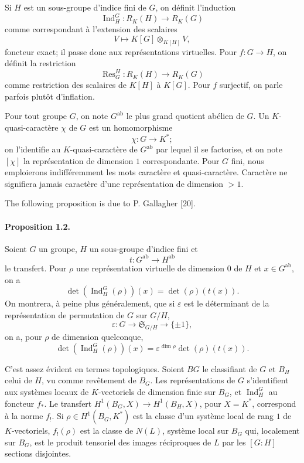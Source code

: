 \documentclass[10pt]{article}
\newcommand{\Ind}{\operatorname{Ind}}
\newcommand{\Res}{\operatorname{Res}}
\begin{document}
Si \(H\) est un sous-groupe d'indice fini de \(G\), on définit l'induction
\[
\Ind_H^G:R_K(H)\longrightarrow R_K(G)
\]
comme correspondant à l'extension des scalaires
\[
V\longmapsto K[G]\otimes_{K[H]}V,
\]
foncteur exact; il passe donc aux représentations virtuelles. Pour \(f:G\to H\), on définit la restriction
\[
\Res_G^H:R_K(H)\longrightarrow R_K(G)
\]
comme restriction des scalaires de \(K[H]\) à \(K[G]\). Pour \(f\) surjectif, on parle parfois plutôt d'inflation.

Pour tout groupe \(G\), on note \(G^{\mathrm{ab}}\) le plus grand quotient abélien de \(G\). Un \(K\)-quasi-caractère \(\chi\) de \(G\) est un homomorphisme
\[
\chi:G\longrightarrow K^*;
\]
on l'identifie au \(K\)-quasi-caractère de \(G^{\mathrm{ab}}\) par lequel il se factorise, et on note \([\chi]\) la représentation de dimension \(1\) correspondante. Pour \(G\) fini, nous emploierons indifféremment les mots caractère et quasi-caractère. Caractère ne signifiera jamais caractère d'une représentation de dimension \(>1\).

The following proposition is due to P. Gallagher [20].

\paragraph{Proposition 1.2.} Soient \(G\) un groupe, \(H\) un sous-groupe d'indice fini et
\[
t:G^{\mathrm{ab}}\longrightarrow H^{\mathrm{ab}}
\]
le transfert. Pour \(\rho\) une représentation virtuelle de dimension \(0\) de \(H\) et \(x\in G^{\mathrm{ab}}\), on a
\[
\det(\Ind_H^G(\rho))(x)=\det(\rho)(t(x)).
\]
On montrera, à peine plus généralement, que si \(\varepsilon\) est le déterminant de la représentation de permutation de \(G\) sur \(G/H\),
\[
\varepsilon:G\longrightarrow \mathfrak S_{G/H}\longrightarrow \{\pm1\},
\]
on a, pour \(\rho\) de dimension quelconque,
\[
\det(\Ind_H^G(\rho))(x)=\varepsilon^{\dim\rho}\det(\rho)(t(x)).
\]

C'est assez évident en termes topologiques. Soient \(BG\) le classifiant de \(G\) et \(B_H\) celui de \(H\), vu comme revêtement de \(B_G\). Les représentations de \(G\) s'identifient aux systèmes locaux de \(K\)-vectoriels de dimension finie sur \(B_G\), et \(\Ind_H^G\) au foncteur \(f_*\). Le transfert \(H^1(B_G,X)\to H^1(B_H,X)\), pour \(X=K^*\), correspond à la norme \(f_!\). Si \(\rho\in H^1(B_G,K^*)\) est la classe d'un système local de rang \(1\) de \(K\)-vectoriels, \(f_!(\rho)\) est la classe de \(N(L)\), système local sur \(B_G\) qui, localement sur \(B_G\), est le produit tensoriel des images réciproques de \(L\) par les \([G:H]\) sections disjointes.
\end{document}
